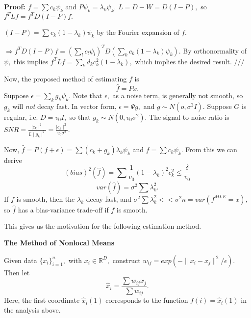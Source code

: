 \documentclass[english]{article}
\begin{document}
\textbf{Proof: $f=\sum c_{k}\psi_{k}$ }and $P\psi_{k}=\lambda_{k}\psi_{k}.$
$L=D-W=D(I-P),$ so $f^{T}Lf=f^{T}D(I-P)f.$ 

$(I-P)=\sum c_{k}(1-\lambda_{k})\psi_{k}$ by the Fourier expansion
of $f.$ 

$\Rightarrow f^{T}D(I-P)f=(\sum_{l}c_{l}\psi_{l})^{T}D(\sum_{k}c_{k}(1-\lambda_{k})\psi_{k}).$
By orthonormality of $\psi,$ this implies $f^{T}Lf=\sum_{k}d_{k}c_{k}^{2}(1-\lambda_{k}),$
which implies the desired result. ///

Now, the proposed method of estimating $f$ is 
\[
\hat{f}=Px.
\]
 Suppose $\epsilon=\sum_{k}g_{k}\psi_{k}.$ Note that $\epsilon,$
as a noise term, is generally not smooth, so $g_{k}$ will \emph{not}
decay fast. In vector form, $\epsilon=\Psi g,$ and $g\sim N(o,\sigma^{2}I).$
Suppose $G$ is regular, i.e. $D=v_{0}I,$ so that $g_{k}\sim N(0,v_{0}\sigma^{2}).$
The signal-to-noise ratio is $SNR=\frac{\mid c_{k}\mid^{2}}{\mathbb{E}\mid g_{k}\mid^{2}}=\frac{\mid c_{k}\mid^{2}}{v_{0}\sigma^{2}}.$ 

Now, $\hat{f}=P(f+\epsilon)=\sum(c_{k}+g_{k})\lambda_{k}\psi_{k}$
and $f=\sum c_{k}\psi_{k}.$ From this we can derive 
\[
(bias)^{2}(\hat{f})=\sum\frac{1}{v_{0}}(1-\lambda_{k})^{2}c_{k}^{2}\leq\frac{\delta}{v_{0}}
\]
\[
var(\hat{f})=\sigma^{2}\sum\lambda_{k}^{2}.
\]
 If $f$ is smooth, then the $\lambda_{k}$ decay fast, and $\sigma^{2}\sum\lambda_{k}^{2}<<\sigma^{2}n=var(f^{MLE}=x),$
so $\hat{f}$ has a bias-variance trade-off if $f$ is smooth. 

This gives us the motivation for the following estimation method. 

\textbf{The Method of Nonlocal Means}

Given data $\{x_{i}\}_{i=1}^{n},$ with $x_{i}\in\mathbb{R}^{D},$
construct $w_{ij}=exp(-\parallel x_{i}-x_{j}\parallel^{2}/\epsilon).$
Then let 
\[
\hat{x}_{i}=\frac{\sum w_{ij}x_{j}}{\sum w_{ij}}.
\]
 Here, the first coordinate $\hat{x}_{i}(1)$ corresponds to the function
$f(i)=\hat{x}_{i}(1)$ in the analysis above. 
\end{document}
